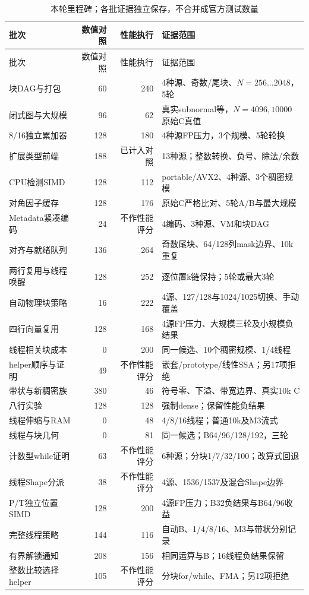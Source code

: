 \documentclass[UTF8,a4paper,11pt]{ctexart}
\begin{document}
\begingroup\small\setlength{\tabcolsep}{3pt}
\begin{longtable}{@{}p{40mm}rrp{56mm}@{}}
\caption{本轮里程碑；各批证据独立保存，不合并成官方测试数量}\\\toprule
批次&数值对照&性能执行&证据范围\\\midrule\endfirsthead
\toprule 批次&数值对照&性能执行&证据范围\\\midrule\endhead
块DAG与打包&60&240&4种源、奇数/尾块、$N=256\ldots2048$，5轮\\
闭式图与大规模&96&62&真实subnormal等，$N=4096,10000$原始C真值\\
8/16独立累加器&128&180&4种源FP压力，3个规模、5轮轮换\\
扩展类型前端&188&已计入对照&13种源；整数转换、负号、除法/余数\\
CPU检测SIMD&128&112&portable/AVX2、4种源、3个稠密规模\\
对角因子缓存&128&176&原始C严格比对、5轮A/B与最大规模\\
Metadata紧凑编码&24&不作性能评分&4编码、3种源、VM和块DAG\\
对齐与就绪队列&136&264&奇数尾块、64/128列mask边界、10k重复\\
两行复用与线程唤醒&128&252&逐位置k链保持；5轮或最大3轮\\
自动物理块策略&16&222&4源、127/128与1024/1025切换、手动覆盖\\
四行向量复用&128&168&4源FP压力、大规模三轮及小规模负结果\\
线程相关块成本&0&200&同一候选、10个稠密规模、1/4线程\\
helper顺序与证明&49&不作性能评分&嵌套/prototype/线性SSA；另17项拒绝\\
带状与新稠密族&380&46&符号零、下溢、带宽边界、真实10k C\\
八行实验&128&128&强制dense；保留性能负结果\\
线程伸缩与RAM&0&48&4/8/16线程；普通10k及M3流式\\
线程与块几何&0&81&同一候选；B64/96/128/192，三轮\\
计数型while证明&63&不作性能评分&6种源；分块1/7/32/100；改算式回退\\
线程Shape分派&38&不作性能评分&4源、1536/1537及混合Shape边界\\
P/T独立位置SIMD&128&200&4源FP压力；B32负结果与B64/96收益\\
完整线程策略&144&116&自动B、1/4/8/16、M3与带状分别记录\\
有界解锁通知&208&156&相同运算与B；16线程负结果保留\\
整数比较选择helper&105&不作性能评分&分块for/while、FMA；另12项拒绝\\

\end{longtable}
\end{document}
